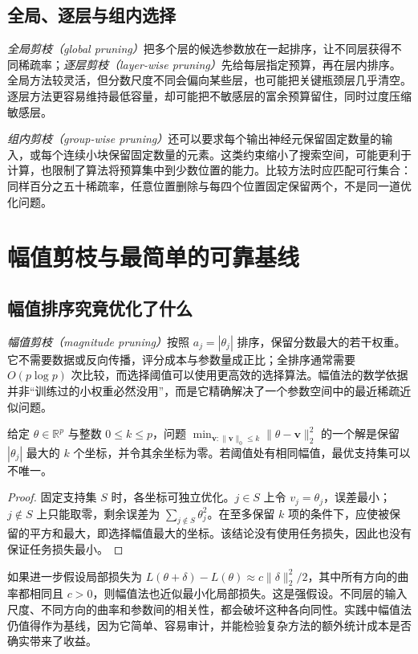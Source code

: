 \documentclass[UTF8,12pt,a4paper,fontset=fandol]{ctexart}
\begin{document}
\subsection{全局、逐层与组内选择}
\emph{全局剪枝（global pruning）}把多个层的候选参数放在一起排序，让不同层获得不同稀疏率；\emph{逐层剪枝（layer-wise pruning）}先给每层指定预算，再在层内排序。全局方法较灵活，但分数尺度不同会偏向某些层，也可能把关键瓶颈层几乎清空。逐层方法更容易维持最低容量，却可能把不敏感层的富余预算留住，同时过度压缩敏感层。

\emph{组内剪枝（group-wise pruning）}还可以要求每个输出神经元保留固定数量的输入，或每个连续小块保留固定数量的元素。这类约束缩小了搜索空间，可能更利于计算，也限制了算法将预算集中到少数位置的能力。比较方法时应匹配可行集合：同样百分之五十稀疏率，任意位置删除与每四个位置固定保留两个，不是同一道优化问题。

\section{幅值剪枝与最简单的可靠基线}
\label{sec:prune-magnitude}

\subsection{幅值排序究竟优化了什么}
\emph{幅值剪枝（magnitude pruning）}按照 $a_j=|\theta_j|$ 排序，保留分数最大的若干权重。它不需要数据或反向传播，评分成本与参数量成正比；全排序通常需要 $O(p\log p)$ 次比较，而选择阈值可以使用更高效的选择算法。幅值法的数学依据并非“训练过的小权重必然没用”，而是它精确解决了一个参数空间中的最近稀疏近似问题。

\begin{proposition}[欧氏距离下的最佳稀疏近似]
\label{prop:prune-hard-threshold}
给定 $\theta\in\mathbb R^p$ 与整数 $0\leq k\leq p$，问题 $\min_{\mathbf v:\|\mathbf v\|_0\leq k}\|\theta-\mathbf v\|_2^2$ 的一个解是保留 $|\theta_j|$ 最大的 $k$ 个坐标，并令其余坐标为零。若阈值处有相同幅值，最优支持集可以不唯一。
\end{proposition}
\begin{proof}
固定支持集 $S$ 时，各坐标可独立优化。$j\in S$ 上令 $v_j=\theta_j$，误差最小；$j\notin S$ 上只能取零，剩余误差为 $\sum_{j\notin S}\theta_j^2$。在至多保留 $k$ 项的条件下，应使被保留的平方和最大，即选择幅值最大的坐标。该结论没有使用任务损失，因此也没有保证任务损失最小。
\end{proof}

如果进一步假设局部损失为 $L(\theta+\delta)-L(\theta)\approx c\|\delta\|_2^2/2$，其中所有方向的曲率都相同且 $c>0$，则幅值法也近似最小化局部损失。这是强假设。不同层的输入尺度、不同方向的曲率和参数间的相关性，都会破坏这种各向同性。实践中幅值法仍值得作为基线，因为它简单、容易审计，并能检验复杂方法的额外统计成本是否确实带来了收益。
\end{document}
